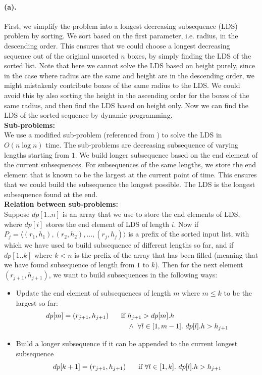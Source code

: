 \documentclass[12pt]{article}
\begin{document}
\paragraph{(a).}
First, we simplify the problem into a longest decreasing subsequence (LDS) problem by sorting. We sort based on the first parameter, i.e. radius, in the descending order. This ensures that we could choose a longest decreasing sequence out of the original unsorted \(n\) boxes, by simply finding the LDS of the sorted list. Note that here we cannot solve the LDS based on height purely, since in the case where radius are the same and height are in the descending order, we might mistakenly contribute boxes of the same radius to the LDS. We could avoid this by also sorting the height in the ascending order for the boxes of the same radius, and then find the LDS based on height only.
Now we can find the LDS of the sorted sequence by dynamic programming. \\
\textbf{Sub-problems:}\\
We use a modified sub-problem (referenced from \cite{OMS})  to solve the LDS in \(O(n\log n)\) time. The sub-problems are decreasing subsequence of varying lengths starting from \(1\). We build longer subsequence based on the end element of the current subsequences. For subsequences of the same lengths, we store the end element that is known to be the largest at the current point of time. This ensures that we could build the subsequence the longest possible. The LDS is the longest subsequence found at the end.\\
\textbf{Relation between sub-problems:} \\
Suppose \(dp[1..n]\) is an array that we use to store the end elements of LDS, where \(dp[i]\) stores the end element of LDS of length \(i\). Now if \(P_j = \langle(r_1,h_1), (r_2, h_2), \hdots, (r_j, h_j)\rangle\) is a prefix of the sorted input list, with which we have used to build subsequence of different lengths so far, and if \(dp[1..k]\) where \(k < n\) is the prefix of the array that has been filled (meaning that we have found subsequence of length from \(1\) to \(k\)). Then for the next element \((r_{j+1}, h_{j+1})\), we want to build subsequences in the following ways:
\begin{itemize}
     \setlength \itemsep{0em} 
     \item Update the end element of subsequences of length \(m\) where \(m \leq k\) to be the largest so far:
     \begin{align*}
          dp[m] = (r_{j+1}, h_{j+1}) \hspace{0.5cm} 
          \text{ if } &h_{j+1} > dp[m].h\\ 
          &\land\ \forall l\in [1,m-1].\ dp[l].h > h_{j+1}
     \end{align*}
     \item Build a longer subsequence if it can be appended to the current longest subsequence
     \begin{equation*}
          dp[k+1] = (r_{j+1}, h_{j+1}) \hspace{0.5cm} \text{ if } \forall l\in[1,k].\ dp[l].h > h_{j+1}
     \end{equation*}
\end{itemize}
 
\end{document}
